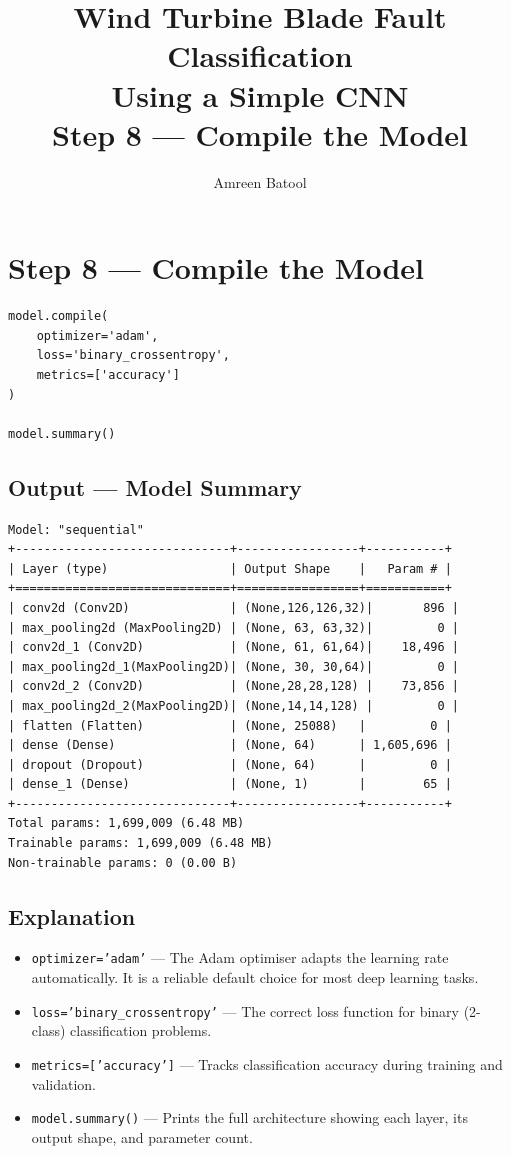 \documentclass[12pt]{article}
\title{\textbf{Wind Turbine Blade Fault Classification\\Using a Simple CNN}\\[0.5em]
\large Step 8 --- Compile the Model}
\author{Amreen Batool}
\date{}
\begin{document}
\maketitle

\section*{Step 8 --- Compile the Model}

\begin{lstlisting}[style=pythonstyle]
model.compile(
    optimizer='adam',
    loss='binary_crossentropy',
    metrics=['accuracy']
)

model.summary()
\end{lstlisting}

\subsection*{Output --- Model Summary}

\begin{lstlisting}[style=outputstyle]
Model: "sequential"
+------------------------------+-----------------+-----------+
| Layer (type)                 | Output Shape    |   Param # |
+==============================+=================+===========+
| conv2d (Conv2D)              | (None,126,126,32)|       896 |
| max_pooling2d (MaxPooling2D) | (None, 63, 63,32)|         0 |
| conv2d_1 (Conv2D)            | (None, 61, 61,64)|    18,496 |
| max_pooling2d_1(MaxPooling2D)| (None, 30, 30,64)|         0 |
| conv2d_2 (Conv2D)            | (None,28,28,128) |    73,856 |
| max_pooling2d_2(MaxPooling2D)| (None,14,14,128) |         0 |
| flatten (Flatten)            | (None, 25088)   |         0 |
| dense (Dense)                | (None, 64)      | 1,605,696 |
| dropout (Dropout)            | (None, 64)      |         0 |
| dense_1 (Dense)              | (None, 1)       |        65 |
+------------------------------+-----------------+-----------+
Total params: 1,699,009 (6.48 MB)
Trainable params: 1,699,009 (6.48 MB)
Non-trainable params: 0 (0.00 B)
\end{lstlisting}

\subsection*{Explanation}

\begin{itemize}
    \item \texttt{optimizer='adam'} --- The Adam optimiser adapts the learning rate automatically. It is a reliable default choice for most deep learning tasks.
    \item \texttt{loss='binary\_crossentropy'} --- The correct loss function for binary (2-class) classification problems.
    \item \texttt{metrics=['accuracy']} --- Tracks classification accuracy during training and validation.
    \item \texttt{model.summary()} --- Prints the full architecture showing each layer, its output shape, and parameter count.
\end{itemize}
\end{document}
